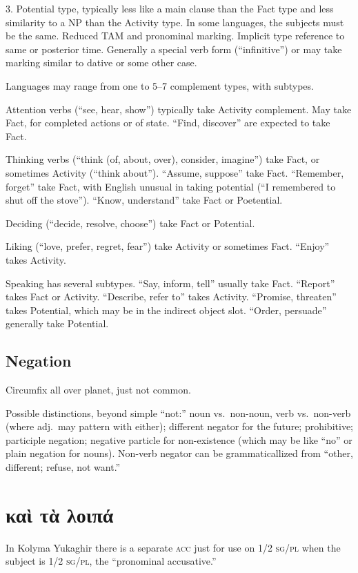\documentclass[11pt]{article}
\newcommand{\I}[1]{\textsc{#1}}   %
\begin{document}
3. Potential type, typically less like a main clause than the Fact
type and less similarity to a NP than the Activity type.  In some
languages, the subjects must be the same.  Reduced TAM and pronominal
marking.  Implicit type reference to same or posterior time.
Generally a special verb form (``infinitive'') or may take marking
similar to dative or some other case.

Languages may range from one to 5--7 complement types, with subtypes.

Attention verbs (``see, hear, show'') typically take Activity
complement.  May take Fact, for completed actions or of state.
``Find, discover'' are expected to take Fact.

Thinking verbs (``think (of, about, over), consider, imagine'') take
Fact, or sometimes Activity (``think about'').  ``Assume, suppose''
take Fact.  ``Remember, forget'' take Fact, with English unusual in
taking potential (``I remembered to shut off the stove'').  ``Know,
understand'' take Fact or Poetential.

Deciding (``decide, resolve, choose'') take Fact or Potential.

Liking (``love, prefer, regret, fear'') take Activity or sometimes
Fact.  ``Enjoy'' takes Activity.

Speaking has several subtypes.  ``Say, inform, tell'' usually take
Fact.  ``Report'' takes Fact or Activity.  ``Describe, refer to''
takes Activity.  ``Promise, threaten'' takes Potential, which may be
in the indirect object slot.  ``Order, persuade'' generally take
Potential. 

\subsection*{Negation}
Circumfix all over planet, just not common.

Possible distinctions, beyond simple ``not:'' noun vs.\ non-noun, verb
vs.\ non-verb (where adj.\ may pattern with either); different negator
for the future; prohibitive; participle negation; negative particle
for non-existence (which may be like ``no'' or plain negation for
nouns).  Non-verb negator can be grammaticallized from ``other,
different; refuse, not want.''


\section{καὶ τὰ λοιπά}

In Kolyma Yukaghir there is a separate \I{acc} just for use on \I{1/2
  sg/pl} when the subject is \I{1/2 sg/pl}, the ``pronominal
accusative.'' 
\end{document}
